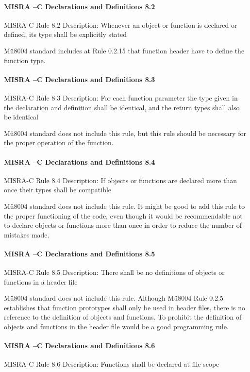 \paragraph{MISRA –C Declarations and Definitions 8.2}
MISRA-C Rule 8.2 Description: Whenever an object or function is declared or defined, its type shall be explicitly stated

Mü8004 standard includes at Rule 0.2.15 that function header have to define the function type.

\paragraph{MISRA –C Declarations and Definitions 8.3}
MISRA-C Rule 8.3 Description: For each function parameter the type given in the declaration and definition shall be identical, and the return types shall also be identical

Mü8004 standard does not include this rule, but this rule should be necessary for the proper operation of the function. 

\paragraph{MISRA –C Declarations and Definitions 8.4}
MISRA-C Rule 8.4 Description: If objects or functions are declared more than once their types shall be compatible

Mü8004 standard does not include this rule. It might be good to add this rule to the proper functioning of the code, even though it would be recommendable not to declare objects or functions more than once in order to reduce the number of mistakes made.

\paragraph{MISRA –C Declarations and Definitions 8.5}
MISRA-C Rule 8.5 Description: There shall be no definitions of objects or functions in a header file

Mü8004 standard does not include this rule.  Although Mü8004 Rule 0.2.5 establishes that function prototypes shall only be used in header files, there is no reference to the definition of objects and functions. To prohibit the definition of objects and functions in the header file would be a good programming rule.

\paragraph{MISRA –C Declarations and Definitions 8.6}
MISRA-C Rule 8.6 Description: Functions shall be declared at file scope

